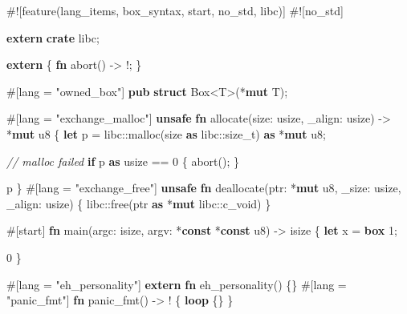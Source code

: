 \documentclass[a4paper,]{book}
\newenvironment{Shaded}{\begin{snugshade}}{\end{snugshade}}
\newcommand{\KeywordTok}[1]{\textcolor[rgb]{0.13,0.29,0.53}{\textbf{{#1}}}}
\newcommand{\DataTypeTok}[1]{\textcolor[rgb]{0.13,0.29,0.53}{{#1}}}
\newcommand{\DecValTok}[1]{\textcolor[rgb]{0.00,0.00,0.81}{{#1}}}
\newcommand{\StringTok}[1]{\textcolor[rgb]{0.31,0.60,0.02}{{#1}}}
\newcommand{\CommentTok}[1]{\textcolor[rgb]{0.56,0.35,0.01}{\textit{{#1}}}}
\newcommand{\AttributeTok}[1]{\textcolor[rgb]{0.77,0.63,0.00}{{#1}}}
\newcommand{\NormalTok}[1]{{#1}}
\begin{document}
\begin{Shaded}
\begin{Highlighting}[]
\AttributeTok{#![}\NormalTok{feature}\AttributeTok{(}\NormalTok{lang_items}\AttributeTok{,} \NormalTok{box_syntax}\AttributeTok{,} \NormalTok{start}\AttributeTok{,} \NormalTok{no_std}\AttributeTok{,} \NormalTok{libc}\AttributeTok{)]}
\AttributeTok{#![}\NormalTok{no_std}\AttributeTok{]}

\KeywordTok{extern} \KeywordTok{crate} \NormalTok{libc;}

\KeywordTok{extern} \NormalTok{\{}
    \KeywordTok{fn} \NormalTok{abort() -> !;}
\NormalTok{\}}

\AttributeTok{#[}\NormalTok{lang }\AttributeTok{=} \StringTok{"owned_box"}\AttributeTok{]}
\KeywordTok{pub} \KeywordTok{struct} \DataTypeTok{Box}\NormalTok{<T>(*}\KeywordTok{mut} \NormalTok{T);}

\AttributeTok{#[}\NormalTok{lang }\AttributeTok{=} \StringTok{"exchange_malloc"}\AttributeTok{]}
\KeywordTok{unsafe} \KeywordTok{fn} \NormalTok{allocate(size: }\DataTypeTok{usize}\NormalTok{, _align: }\DataTypeTok{usize}\NormalTok{) -> *}\KeywordTok{mut} \DataTypeTok{u8} \NormalTok{\{}
    \KeywordTok{let} \NormalTok{p = libc::malloc(size }\KeywordTok{as} \NormalTok{libc::}\DataTypeTok{size_t}\NormalTok{) }\KeywordTok{as} \NormalTok{*}\KeywordTok{mut} \DataTypeTok{u8}\NormalTok{;}

    \CommentTok{// malloc failed}
    \KeywordTok{if} \NormalTok{p }\KeywordTok{as} \DataTypeTok{usize} \NormalTok{== }\DecValTok{0} \NormalTok{\{}
        \NormalTok{abort();}
    \NormalTok{\}}

    \NormalTok{p}
\NormalTok{\}}
\AttributeTok{#[}\NormalTok{lang }\AttributeTok{=} \StringTok{"exchange_free"}\AttributeTok{]}
\KeywordTok{unsafe} \KeywordTok{fn} \NormalTok{deallocate(ptr: *}\KeywordTok{mut} \DataTypeTok{u8}\NormalTok{, _size: }\DataTypeTok{usize}\NormalTok{, _align: }\DataTypeTok{usize}\NormalTok{) \{}
    \NormalTok{libc::free(ptr }\KeywordTok{as} \NormalTok{*}\KeywordTok{mut} \NormalTok{libc::}\DataTypeTok{c_void}\NormalTok{)}
\NormalTok{\}}

\AttributeTok{#[}\NormalTok{start}\AttributeTok{]}
\KeywordTok{fn} \NormalTok{main(argc: }\DataTypeTok{isize}\NormalTok{, argv: *}\KeywordTok{const} \NormalTok{*}\KeywordTok{const} \DataTypeTok{u8}\NormalTok{) -> }\DataTypeTok{isize} \NormalTok{\{}
    \KeywordTok{let} \NormalTok{x = }\KeywordTok{box} \DecValTok{1}\NormalTok{;}

    \DecValTok{0}
\NormalTok{\}}

\AttributeTok{#[}\NormalTok{lang }\AttributeTok{=} \StringTok{"eh_personality"}\AttributeTok{]} \KeywordTok{extern} \KeywordTok{fn} \NormalTok{eh_personality() \{\}}
\AttributeTok{#[}\NormalTok{lang }\AttributeTok{=} \StringTok{"panic_fmt"}\AttributeTok{]} \KeywordTok{fn} \NormalTok{panic_fmt() -> ! \{ }\KeywordTok{loop} \NormalTok{\{\} \}}
\end{Highlighting}
\end{Shaded}
\end{document}
